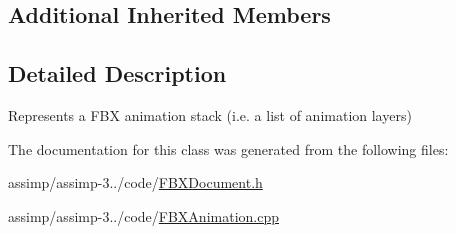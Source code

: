 \subsection*{Additional Inherited Members}


\subsection{Detailed Description}
Represents a F\+B\+X animation stack (i.\+e. a list of animation layers) 

The documentation for this class was generated from the following files\+:\begin{DoxyCompactItemize}
\item 
assimp/assimp-\/3../code/\hyperlink{_f_b_x_document_8h}{F\+B\+X\+Document.\+h}\item 
assimp/assimp-\/3../code/\hyperlink{_f_b_x_animation_8cpp}{F\+B\+X\+Animation.\+cpp}\end{DoxyCompactItemize}
